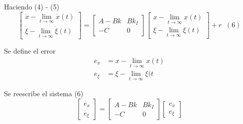 Haciendo (4) - (5)
\[
    \begin{bmatrix}
        \dot{x} - \lim_{t \to \infty}\dot{x}(t) \\
        \dot{\xi} - \lim_{t \to \infty}\dot{\xi}(t)
    \end{bmatrix} = 
    \begin{bmatrix}
        A-Bk & Bk_{I} \\
        -C & 0
    \end{bmatrix}
    \begin{bmatrix}
        x - \lim_{t \to \infty}x(t) \\ 
        \xi - \lim_{t \to \infty}\xi(t)
    \end{bmatrix} + r \;\; (6)
\]

Se define el error
\[
    \begin{split}
        e_{x} & = x - \lim_{t \to \infty} x(t) \\
        e_{\xi} & = \xi - \lim_{t \to \infty} \xi(t
    \end{split}
\]

Se reescribe el sistema (6)
\[
    \begin{bmatrix}
        \dot{e_{x}} \\
        \dot{e_{\xi}}
    \end{bmatrix} = 
    \begin{bmatrix}
        A-Bk & Bk_{I} \\
        -C & 0
    \end{bmatrix}
    \begin{bmatrix}
        e_{x} \\ 
        e_{\xi}
    \end{bmatrix}
\]

